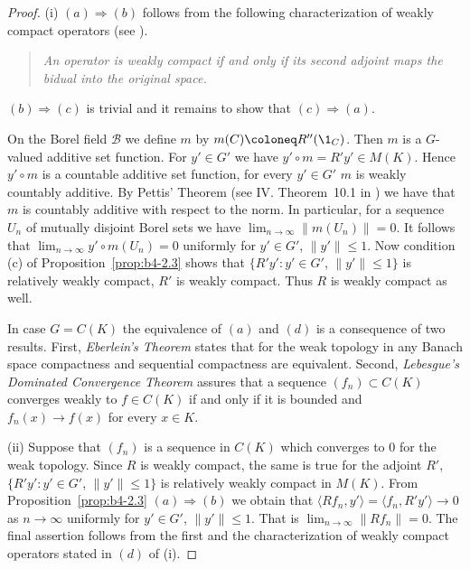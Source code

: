 \begin{proof}
(i) $(a)\Rightarrow(b)$ follows from the following characterization of
weakly compact operators (see \eg \textcite[II. Proposition~9.4 ]{schaefer:1974}).
\begin{quote}
    \emph{
    An operator is weakly compact if and only if its second adjoint
    maps the bidual into the original space.
    }
\end{quote}
$(b)\Rightarrow(c)$ is trivial and it remains to show that $(c) \Rightarrow (a)$.

On the Borel field $\mathcal{B}$ we define $m$ by $m(C)  \coloneq  R''(\1_C)$.
Then $m$ is
a $G$-valued additive set function.
For $y' \in G'$ we have
$y'\circ m = R'y' \in M(K)$.
Hence $y'\circ m$ is a countable additive set function, for every $y' \in G'$  \ie $m$ is weakly countably additive.
By Pettis' Theorem (see IV. Theorem~10.1 in 
\textcite{dunfordschwartz:1958}) we have
that $m$ is countably additive with respect to the norm.
In particular, for a sequence $U_n$ of mutually disjoint Borel sets we have
$\lim_{n\to\infty}\|m(U_n)\| = 0$.
It follows that $\lim_{n\to\infty}y'\circ m(U_n) = 0$ uniformly for
$y' \in G'$, $\|y'\| \leq 1$.
Now condition (c) of Proposition~\ref{prop:b4-2.3} shows that $\{R'y'
\colon y' \in G'$, $\|y'\| \leq 1\}$ is relatively weakly compact, \ie  $R'$ is
weakly compact.
Thus $R$ is weakly compact as well.

In case $G = C(K)$ the equivalence of\/ $(a)$ and $(d)$ is a consequence of
two results. First, \emph{Eberlein's Theorem} states that for the weak topology in any Banach space compactness and sequential compactness are
equivalent.
Second, \emph{Lebesgue's Dominated Convergence Theorem} assures
that a sequence $(f_n) \subset C(K)$ converges weakly to $f \in C(K)$ if and
only if it is bounded and $f_n(x) \to f(x)$ for every $x \in K$.
	
(ii) Suppose that $(f_n)$ is a sequence in $C(K)$ which converges to $0$ for
the weak topology.
Since $R$ is weakly compact, the same is true for
the adjoint $R'$, \ie $\{R'y' \colon y' \in G'$, $\|y'\| \leq 1\}$ is relatively weakly compact in $M(K)$.
From Proposition~\ref{prop:b4-2.3} $(a)\Rightarrow(b)$ we obtain that
$\langle Rf_n,y'\rangle = \langle f_n,R'y'\rangle \to 0$ as $n \to \infty$ uniformly for $y' \in G'$, $\|y'\|\leq1$.
That is $\lim_{n\to\infty}\|Rf_n\| = 0$.
The final assertion follows from the first and the characterization of
weakly compact operators stated in $(d)$ of (i).
\end{proof}
